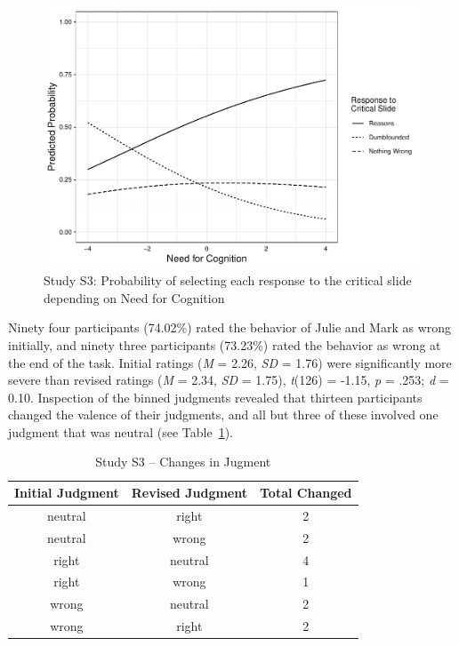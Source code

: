 \documentclass[
  man,floatsintext]{apa6}
\begin{document}
\begin{figure}[!h]
\includegraphics{Supplementary_files/figure-latex/S3ggplotlogit3-1} \caption{Study S3: Probability of selecting each response to the critical slide depending on Need for Cognition}\label{fig:S3ggplotlogit3}
\end{figure}

Ninety four participants (74.02\%) rated the behavior of Julie and Mark as wrong initially, and ninety three participants (73.23\%) rated the behavior as wrong at the end of the task. Initial ratings (\emph{M} = 2.26, \emph{SD} = 1.76) were significantly more severe than revised ratings (\emph{M} = 2.34, \emph{SD} = 1.75), \emph{t}(126) = -1.15, \emph{p} = .253; \emph{d} = 0.10. Inspection of the binned judgments revealed that thirteen participants changed the valence of their judgments, and all but three of these involved one judgment that was neutral (see Table~\ref{tab:tabS3change}).

\begin{table}[tbp]

\begin{center}
\begin{threeparttable}

\caption{\label{tab:tabS3change}Study S3 – Changes in Jugment}

\begin{tabular}{ccc}
\toprule
Initial Judgment & \multicolumn{1}{c}{Revised Judgment} & \multicolumn{1}{c}{Total Changed}\\
\midrule
neutral & right & 2\\
neutral & wrong & 2\\
right & neutral & 4\\
right & wrong & 1\\
wrong & neutral & 2\\
wrong & right & 2\\
\bottomrule
\end{tabular}

\end{threeparttable}
\end{center}

\end{table}
\end{document}

